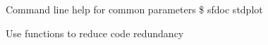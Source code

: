 
    




    
%

        




\begin{frame}   
  \begin{block}{Command line help for common parameters}
    \$ sfdoc stdplot
  \end{block}
  \begin{block}{Use functions to reduce code redundancy}
   
  \end{block}
\end{frame}

